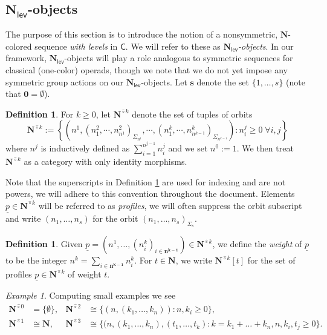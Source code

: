 \documentclass[11pt]{amsart}
\theoremstyle{definition}
\newtheorem{definition}[subsection]{Definition}
\theoremstyle{remark}
\newtheorem{example}[subsection]{Example}
\newcommand{\Spt}{\mathsf{Spt}}
\newcommand{\Ncirc}[1]{\mathbf{N}^{\hat{\circ}#1}}
\newcommand{\Nl}{\mathbf{N}_{\mathsf{lev}}}
\begin{document}
\subsection{$\Nl$-objects}
The purpose of this section is to introduce the notion of a nonsymmetric, $\mathbf{N}$-colored sequence \textit{with levels} in $\mathsf{C}$. We will refer to these as \textit{$\Nl$-objects}. %
In our framework, $\Nl$-objects will play a role analogous to symmetric sequences for classical (one-color) operads, though we note that we do not yet impose any symmetric group actions on our $\Nl$-objects. Let $\mathbf{s}$ denote the set $\{1,\dots,s\}$ (note that $\mathbf{0}=\emptyset$). 

\begin{definition} 
\label{N-circhat-k}
For $k\geq 0$, let $\mathbf{N}^{\hat{\circ}k}$ denote the set of tuples of orbits
\[ 
\mathbf{N}^{\hat{\circ}k}:=\left\{ \left(n^1,(n^2_1,\cdots,n^2_{n^1})_{\Sigma_{n^1}} , \cdots, (n^{k}_1,\cdots, n^k_{n^{k-1}})_{\Sigma_{n^{k-1}}}\right): n^j_i \geq 0\; \forall i,j\right\}
\]
where $n^{j}$ is inductively defined as $\sum_{i=1}^{n^{j-1}} n^j_i$ and we set $n^0:=1$. We then treat $\Ncirc{k}$ as a category with only identity morphisms. 
\end{definition}

Note that the superscripts in Definition \ref{N-circhat-k} are used for indexing and are not powers, we will adhere to this convention throughout the document. %
Elements $\underline{p}\in \Ncirc{k}$ will be referred to as \textit{profiles}, we will often suppress the orbit subscript and write $(n_1,\dots,n_s)$ for the orbit $(n_1,\dots,n_s)_{\Sigma_s}$.

\begin{definition} Given $\underline{p}=(n^1, \dots, (n^{k}_i)_{i\in \mathbf{n^{k-1}}})\in \Ncirc{k}$, we define the \textit{weight} of $\underline{p}$ to be the integer
$n^k=\sum_{i\in \mathbf{n^{k-1}}} n^k_i$. For $t\in \mathbf{N}$, we write $\Ncirc{k}[t]$ for the set of profiles $\underline{p}\in \Ncirc{k}$ of weight $t$.
\end{definition} 

\begin{example}
\label{Nl-ex-1}Computing small examples we see \begin{align*}
\Ncirc{0} & = \{\emptyset\},
&
\Ncirc{2} & \cong \{ (n, (k_1,\dots,k_n)): n,k_i\geq 0\},
\\
\Ncirc{1} & \cong \mathbf{N},
&
\Ncirc{3} & \cong \{(n, (k_1,\dots,k_n), (t_1,\dots, t_k): k=k_1+\dots+k_n, n,k_i,t_j\geq 0\}. \nonumber
\end{align*}
\end{example}
\end{document}
